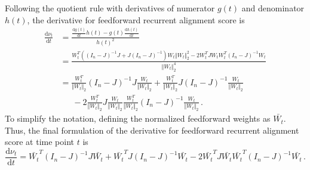 \documentclass[11pt]{article}
\begin{document}
	Following the quotient rule with derivatives of numerator $g(t)$ and denominator $h(t)$, the derivative for feedforward recurrent alignment score is 
		\begin{equation}
			\begin{split}
				\frac{\mathrm{d}\nu_t}{\mathrm{d}t} &= \frac{\frac{\mathrm{d}g(t)}{\mathrm{d}t}h(t) - g(t)\frac{\mathrm{d}h(t)}{\mathrm{d}t}}{h(t)^2} \\
				&= \frac{W_t^T \left( (I_n - J)^{-1}J + J(I_n - J)^{-1}\right)W_t \Vert W_t \Vert_2^2 - 2W_t^TJW_tW_t^T (I_n - J)^{-1} W_t }{\Vert W_t \Vert_2^4} \\
				&= \frac{W_t^T}{\Vert W_t \Vert_2} (I_n-J)^{-1} J \frac{W_t}{\Vert W_t \Vert_2} + \frac{W_t^T}{\Vert W_t \Vert_2} J (I_n-J)^{-1} \frac{W_t}{\Vert W_t \Vert_2} \\
				&\, \, \, \, \, \, \, \, \, -2 \frac{W_t^T}{\Vert W_t \Vert_2} J \frac{W_t}{\Vert W_t \Vert_2} \frac{W_t^T}{\Vert W_t \Vert_2} (I_n-J)^{-1} \frac{W_t}{\Vert W_t \Vert_2}  \, .
			\end{split}
		\end{equation}
	To simplify the notation, defining the normalized feedforward weights as $\bar{W_t}$. Thus, the final formulation of the derivative for feedforward recurrent alignment score at time point $t$ is
		\begin{equation}
			\frac{\mathrm{d}\nu_t}{\mathrm{d}t} = \bar{W_t}^T (I_n-J)^{-1}J\bar{W_t} + \bar{W_t}^T J(I_n -J)^{-1} \bar{W_t} - 2\bar{W_t}^TJ\bar{W_t}\bar{W_t}^T(I_n-J)^{-1}\bar{W_t} \, .
		\end{equation}
	
	
	
\end{document}
